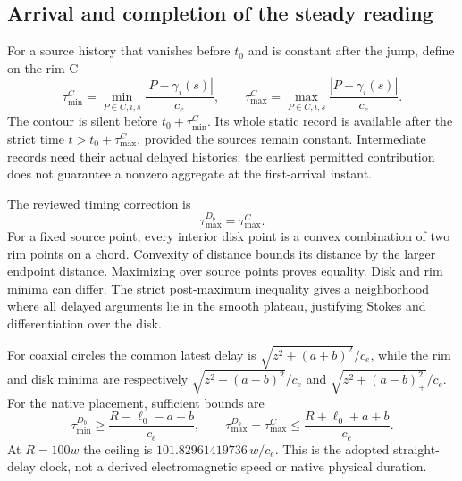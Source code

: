 \subsection{Arrival and completion of the steady reading}\label{sec:delay}
For a source history that vanishes before \(t_0\) and is constant after the jump, define on the rim C
\begin{equation}\label{eq:delays}
\tau_{\min}^{C}=\min_{P\in C,i,s}\frac{|P-\gamma_i(s)|}{c_e},
\qquad
\tau_{\max}^{C}=\max_{P\in C,i,s}\frac{|P-\gamma_i(s)|}{c_e}.
\end{equation}
The contour is silent before \(t_0+\tau_{\min}^C\). Its whole static record is available after the strict time \(t>t_0+\tau_{\max}^C\), provided the sources remain constant. Intermediate records need their actual delayed histories; the earliest permitted contribution does not guarantee a nonzero aggregate at the first-arrival instant.

The reviewed timing correction is
\begin{equation}\label{eq:delaymaxequal}
\boxed{\tau_{\max}^{D_b}=\tau_{\max}^{C}.}
\end{equation}
For a fixed source point, every interior disk point is a convex combination of two rim points on a chord. Convexity of distance bounds its distance by the larger endpoint distance. Maximizing over source points proves equality. Disk and rim minima can differ. The strict post-maximum inequality gives a neighborhood where all delayed arguments lie in the smooth plateau, justifying Stokes and differentiation over the disk.

For coaxial circles the common latest delay is
\(\sqrt{z^2+(a+b)^2}/c_e\), while the rim and disk minima are respectively
\(\sqrt{z^2+(a-b)^2}/c_e\) and \(\sqrt{z^2+(a-b)_+^2}/c_e\).
For the native placement, sufficient bounds are
\begin{equation}\label{eq:delaybounds}
\tau_{\min}^{D_b}\ge\frac{R-\ell_0-a-b}{c_e},\qquad
\tau_{\max}^{D_b}=\tau_{\max}^{C}\le\frac{R+\ell_0+a+b}{c_e}.
\end{equation}
At \(R=100w\) the ceiling is \(101.82961419736\,w/c_e\). This is the adopted straight-delay clock, not a derived electromagnetic speed or native physical duration.
